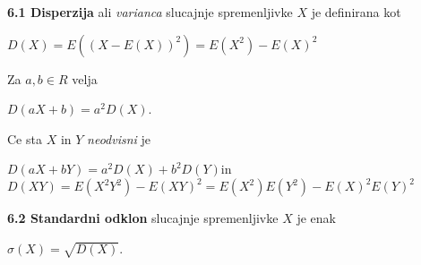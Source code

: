 \documentclass{article}
\begin{document}
\begin{multicols}{3}
\textbf{6.1 Disperzija} ali \textit{varianca} slucajnje spremenljivke $X$
je definirana kot
\begin{center}
    \begin{math}
        D(X) = E((X - E(X))^2) = E(X^2) - E(X)^2
    \end{math}
\end{center}
Za $a, b \in R$ velja
\begin{center}
    \begin{math}
        D(aX + b) = a^2 D(X)
    \end{math}.
\end{center} 
Ce sta $X$ in $Y$ \textit{neodvisni} je 
\begin{center}
    \begin{small}
        \begin{math}
            D(aX + bY) = a^2D(X) + b^2D(Y)
        \end{math}in
        \begin{math}
            D(XY) = E(X^2Y^2) - E(XY)^2 = E(X^2)E(Y^2) - E(X)^2E(Y)^2
        \end{math}
    \end{small}
\end{center}

\textbf{6.2 Standardni odklon} slucajnje spremenljivke $X$
je enak 
\begin{center}
    \begin{math}
        \sigma(X) = \sqrt{D(X)}
    \end{math}.
\end{center}


\end{multicols}
\end{document}
